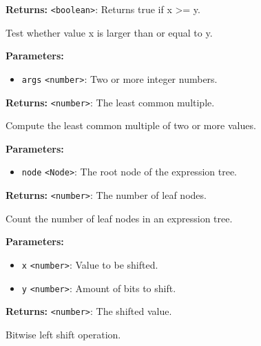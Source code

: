 \documentclass[12pt,a4paper]{article}
\begin{document}
\noindent \textbf{Returns:} \texttt{<boolean>}: Returns true if x >= y.

\noindent Test whether value x is larger than or equal to y.

\vspace{5mm}
\noindent {}


\noindent \textbf{Parameters:}
\begin{itemize}
  \item \texttt{args} \texttt{<number>}: Two or more integer numbers.
\end{itemize}

\noindent \textbf{Returns:} \texttt{<number>}: The least common multiple.

\noindent Compute the least common multiple of two or more values.

\vspace{5mm}
\noindent {}


\noindent \textbf{Parameters:}
\begin{itemize}
  \item \texttt{node} \texttt{<Node>}: The root node of the expression tree.
\end{itemize}

\noindent \textbf{Returns:} \texttt{<number>}: The number of leaf nodes.

\noindent Count the number of leaf nodes in an expression tree.

\vspace{5mm}
\noindent {}


\noindent \textbf{Parameters:}
\begin{itemize}
  \item \texttt{x} \texttt{<number>}: Value to be shifted.
  \item \texttt{y} \texttt{<number>}: Amount of bits to shift.
\end{itemize}

\noindent \textbf{Returns:} \texttt{<number>}: The shifted value.

\noindent Bitwise left shift operation.
\end{document}
